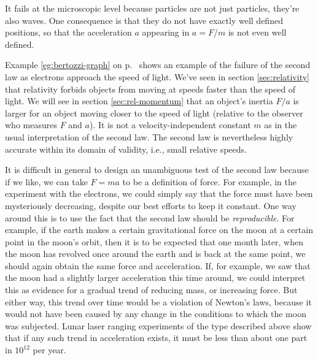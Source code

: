 \begin{listing}{1}
\begin{listing}{1}
\begin{listing}{1}
It fails at the microscopic level because particles are not just particles, they're also waves.
One consequence is that they do not have exactly well defined positions, so that the acceleration $a$
appearing in $a=F/m$ is not even well defined.

Example \ref{eg:bertozzi-graph} on p.~\pageref{eg:bertozzi-graph} shows an example of the failure of the second
law as electrons approach the speed of light.
We've seen in section \ref{sec:relativity} that relativity forbids objects from moving at speeds
faster than the speed of light. We will see in section \ref{sec:rel-momentum} that an object's inertia 
$F/a$ is larger for an object moving closer to the speed of light (relative to the observer who measures $F$ and $a$).
It is not a velocity-independent constant $m$ as in the usual interpretation of the second law.
The second law is nevertheless highly accurate within
its domain of validity, i.e., small relative speeds.

It is difficult in general to design an unambiguous test of the second law because if we like, we can take
$F=ma$ to be a definition of force. For example, in the experiment with the electrons,
we could simply say that the force must have been mysteriously decreasing, despite our best efforts to keep it constant.
One way around this is to use the fact that the second law should be \emph{reproducible}. For example, if the earth
makes a certain gravitational force on the moon at a certain point in the moon's orbit, then it is to be expected that
one month later, when the moon has revolved once around the earth and is back at the same point, we should 
again obtain the same force and acceleration. If, for example, we saw that the moon had a slightly larger
acceleration this time around, we could interpret this as evidence for a gradual trend of reducing mass, or
increasing force. But either way, this trend over time would be a violation of Newton's laws, because it would
not have been caused by any change in the conditions to which the moon was subjected. Lunar laser ranging experiments
of the type described above show that if any such trend in acceleration exists, it must be less than about
one part in $10^{12}$ per year.


\end{listing}
\end{listing}
\end{listing}
